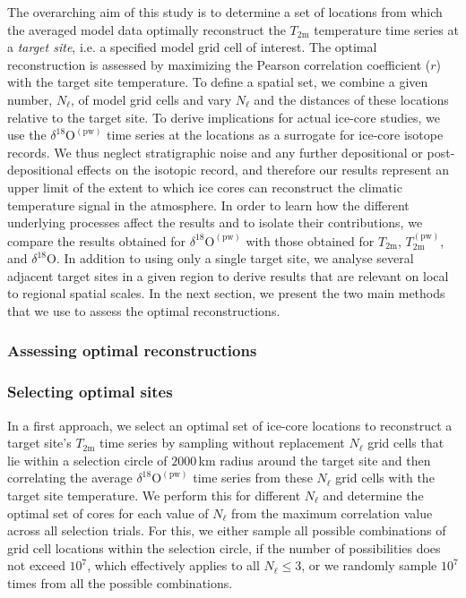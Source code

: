 \documentclass[cp]{copernicus}
\begin{document}
The overarching aim of this study is to determine a set of locations from which
the averaged model data optimally reconstruct the $T_{2\mathrm{m}}$ temperature
time series at a \emph{target site}, i.e. a specified model grid cell of
interest. The optimal reconstruction is assessed by maximizing the Pearson
correlation coefficient ($r$) with the target site temperature. To define a
spatial set, we combine a given number, $N_{\ell}$, of model grid cells and vary
$N_{\ell}$ and the distances of these locations relative to the target site. To
derive implications for actual ice-core studies, we use the
$\delta^{18}\mathrm{O}^{\mathrm{(pw)}}$ time series at the locations as a
surrogate for ice-core isotope records. We thus neglect stratigraphic noise and
any further depositional or post-depositional effects on the isotopic record,
and therefore our results represent an upper limit of the extent to which ice
cores can reconstruct the climatic temperature signal in the atmosphere. In
order to learn how the different underlying processes affect the results and to
isolate their contributions, we compare the results obtained for
$\delta^{18}\mathrm{O}^{\mathrm{(pw)}}$ with those obtained for
$T_{2\mathrm{m}}$, $T_{2\mathrm{m}}^{\mathrm{(pw)}}$, and
$\delta^{18}\mathrm{O}$. In addition to using only a single target site, we
analyse several adjacent target sites in a given region to derive results that
are relevant on local to regional spatial scales. In the next section, we
present the two main methods that we use to assess the optimal reconstructions.

\subsubsection{Assessing optimal reconstructions}\label{methods:opt.sampling}

\subsubsection*{Selecting optimal sites}

In a first approach, we select an optimal set of ice-core locations to
reconstruct a target site's $T_{2\mathrm{m}}$ time series by sampling without
replacement $N_{\ell}$ grid cells that lie within a selection circle of
$2000$\,km radius around the target site and then correlating the average
$\delta^{18}\mathrm{O}^{\mathrm{(pw)}}$ time series from these $N_{\ell}$ grid
cells with the target site temperature. We perform this for different $N_{\ell}$
and determine the optimal set of cores for each value of $N_{\ell}$ from the
maximum correlation value across all selection trials. For this, we either
sample all possible combinations of grid cell locations within the selection
circle, if the number of possibilities does not exceed $10^7$, which effectively
applies to all $N_{\ell}\le3$, or we randomly sample $10^7$ times from all the
possible combinations.\newline
\end{document}
